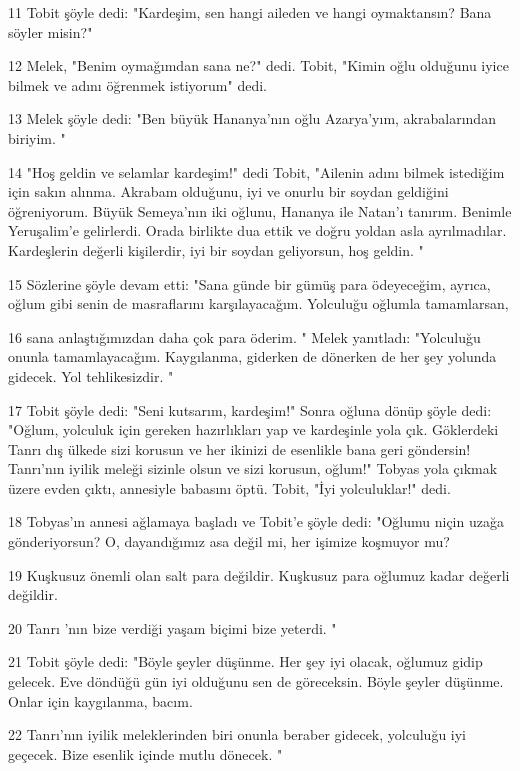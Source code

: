 \par 11 Tobit şöyle dedi: "Kardeşim, sen hangi aileden ve hangi oymaktansın? Bana söyler misin?"
\par 12 Melek, "Benim oymağımdan sana ne?" dedi. Tobit, "Kimin oğlu olduğunu iyice bilmek ve adını öğrenmek istiyorum" dedi.
\par 13 Melek şöyle dedi: "Ben büyük Hananya'nın oğlu Azarya'yım, akrabalarından biriyim. "
\par 14 "Hoş geldin ve selamlar kardeşim!" dedi Tobit, "Ailenin adını bilmek istediğim için sakın alınma. Akrabam olduğunu, iyi ve onurlu bir soydan geldiğini öğreniyorum. Büyük Semeya'nın iki oğlunu, Hananya ile Natan'ı tanırım. Benimle Yeruşalim'e gelirlerdi. Orada birlikte dua ettik ve doğru yoldan asla ayrılmadılar. Kardeşlerin değerli kişilerdir, iyi bir soydan geliyorsun, hoş geldin. "
\par 15 Sözlerine şöyle devam etti: "Sana günde bir gümüş para ödeyeceğim, ayrıca, oğlum gibi senin de masraflarını karşılayacağım. Yolculuğu oğlumla tamamlarsan,
\par 16 sana anlaştığımızdan daha çok para öderim. " Melek yanıtladı: "Yolculuğu onunla tamamlayacağım. Kaygılanma, giderken de dönerken de her şey yolunda gidecek. Yol tehlikesizdir. "
\par 17 Tobit şöyle dedi: "Seni kutsarım, kardeşim!" Sonra oğluna dönüp şöyle dedi: "Oğlum, yolculuk için gereken hazırlıkları yap ve kardeşinle yola çık. Göklerdeki Tanrı dış ülkede sizi korusun ve her ikinizi de esenlikle bana geri göndersin! Tanrı'nın iyilik meleği sizinle olsun ve sizi korusun, oğlum!" Tobyas yola çıkmak üzere evden çıktı, annesiyle babasını öptü. Tobit, "İyi yolculuklar!" dedi.
\par 18 Tobyas'ın annesi ağlamaya başladı ve Tobit'e şöyle dedi: "Oğlumu niçin uzağa gönderiyorsun? O, dayandığımız asa değil mi, her işimize koşmuyor mu?
\par 19 Kuşkusuz önemli olan salt para değildir. Kuşkusuz para oğlumuz kadar değerli değildir.
\par 20 Tanrı 'nın bize verdiği yaşam biçimi bize yeterdi. "
\par 21 Tobit şöyle dedi: "Böyle şeyler düşünme. Her şey iyi olacak, oğlumuz gidip gelecek. Eve döndüğü gün iyi olduğunu sen de göreceksin. Böyle şeyler düşünme. Onlar için kaygılanma, bacım.
\par 22 Tanrı'nın iyilik meleklerinden biri onunla beraber gidecek, yolculuğu iyi geçecek. Bize esenlik içinde mutlu dönecek. "

